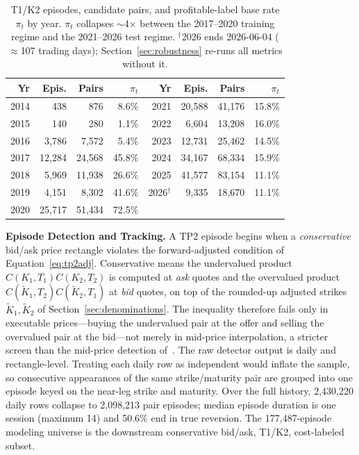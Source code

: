 \documentclass[sigconf,review,anonymous]{acmart}
\begin{document}
\begin{table}[t]
\centering
\footnotesize
\begin{tabular}{rrrr@{\hskip 1.4em}rrrr}
\toprule
Yr & Epis. & Pairs & $\pi_t$ & Yr & Epis. & Pairs & $\pi_t$ \\
\midrule
2014 & 438 & 876 & 8.6\% & 2021 & 20{,}588 & 41{,}176 & 15.8\% \\
2015 & 140 & 280 & 1.1\% & 2022 & 6{,}604 & 13{,}208 & 16.0\% \\
2016 & 3{,}786 & 7{,}572 & 5.4\% & 2023 & 12{,}731 & 25{,}462 & 14.5\% \\
2017 & 12{,}284 & 24{,}568 & 45.8\% & 2024 & 34{,}167 & 68{,}334 & 15.9\% \\
2018 & 5{,}969 & 11{,}938 & 26.6\% & 2025 & 41{,}577 & 83{,}154 & 11.1\% \\
2019 & 4{,}151 & 8{,}302 & 41.6\% & 2026$^\dagger$ & 9{,}335 & 18{,}670 & 11.1\% \\
2020 & 25{,}717 & 51{,}434 & 72.5\% & & & & \\
\bottomrule
\end{tabular}
\caption{T1/K2 episodes, candidate pairs, and profitable-label base rate $\pi_t$ by year. $\pi_t$ collapses $\sim$4$\times$ between the 2017--2020 training regime and the 2021--2026 test regime. $^\dagger$2026 ends 2026-06-04 ($\approx$107 trading days); Section~\ref{sec:robustness} re-runs all metrics without it.}
\label{tab:peryear}
\end{table}

\medskip\noindent\textbf{Episode Detection and Tracking.}
\label{sec:episode-tracking}
A TP2 episode begins when a \emph{conservative} bid/ask price rectangle violates the forward-adjusted condition of Equation~\eqref{eq:tp2adj}. Conservative means the undervalued product $C(K_1,T_1)C(K_2,T_2)$ is computed at \emph{ask} quotes and the overvalued product $C(\tilde K_1,T_2)C(\tilde K_2,T_1)$ at \emph{bid} quotes, on top of the rounded-up adjusted strikes $\tilde K_1,\tilde K_2$ of Section~\ref{sec:denominations}. The inequality therefore fails only in executable prices---buying the undervalued pair at the offer and selling the overvalued pair at the bid---not merely in mid-price interpolation, a stricter screen than the mid-price detection of~\cite{glasserman2025tp2}. The raw detector output is daily and rectangle-level. Treating each daily row as independent would inflate the sample, so consecutive appearances of the same strike/maturity pair are grouped into one episode keyed on the near-leg strike and maturity. Over the full history, 2{,}430{,}220 daily rows collapse to 2{,}098{,}213 pair episodes; median episode duration is one session (maximum 14) and 50.6\% end in true reversion. The 177{,}487-episode modeling universe is the downstream conservative bid/ask, T1/K2, cost-labeled subset.
\end{document}
